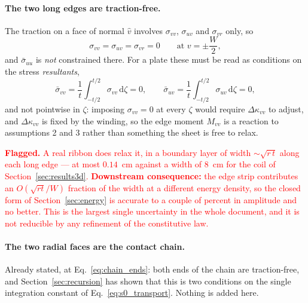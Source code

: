 \documentclass[11pt]{article}
\newcommand{\flagline}[1]{\par\medskip\noindent\textcolor{red}{\textbf{Flagged.}
  #1}\par\medskip}
\begin{document}
\paragraph{The two long edges are traction-free.} The traction on a face of
normal $\hat v$ involves $\sigma_{vv}$, $\sigma_{uv}$ and $\sigma_{vr}$ only, so
\begin{equation}\label{eq:edge_free}
    \sigma_{vv} = \sigma_{uv} = \sigma_{vr} = 0
    \qquad\text{at } v = \pm\frac{W}{2},
\end{equation}
and $\bar\sigma_{uu}$ is \emph{not} constrained there. For a plate these must be
read as conditions on the stress \emph{resultants},
\begin{equation}\label{eq:edge_resultants}
    \boxed{\;\bar\sigma_{vv}
      = \frac{1}{t}\int_{-t/2}^{t/2}\sigma_{vv}\,\mathrm d\zeta = 0,
    \qquad
    \bar\sigma_{uv}
      = \frac{1}{t}\int_{-t/2}^{t/2}\sigma_{uv}\,\mathrm d\zeta = 0,\;}
\end{equation}
and not pointwise in $\zeta$: imposing $\sigma_{vv} = 0$ at every $\zeta$ would
require $\Delta\kappa_{vv}$ to adjust, and $\Delta\kappa_{vv}$ is fixed by the
winding, so the edge moment $M_{vv}$ is a reaction to assumptions 2 and 3 rather
than something the sheet is free to relax.

\flagline{A real ribbon does relax it, in a boundary layer of width
$\sim\sqrt{r\,t}$ along each long edge --- at most $0.14$~cm against a width of
$8$~cm for the coil of Section~\ref{sec:results3d}. \textbf{Downstream
consequence:} the edge strip contributes an $O\!\left(\sqrt{rt}/W\right)$
fraction of the width at a different energy density, so the closed form of
Section~\ref{sec:energy} is accurate to a couple of percent in amplitude and no
better. This is the largest single uncertainty in the whole document, and it is
not reducible by any refinement of the constitutive law.}

\paragraph{The two radial faces are the contact chain.} Already stated, at
Eq.~\eqref{eq:chain_ends}: both ends of the chain are traction-free, and
Section~\ref{sec:recursion} has shown that this is two conditions on the single
integration constant of Eq.~\eqref{eq:s0_transport}. Nothing is added here.
\end{document}
